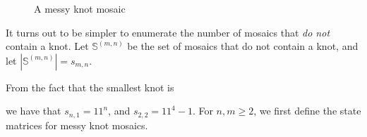 \documentclass[12pt]{article}
\theoremstyle{plain}
\theoremstyle{definition}
\theoremstyle{remark}
\theoremstyle{definition}
\newcommand{\cell}[4]{ \draw[thick] ( #1 , #2 ) rectangle ( #3 , #4 );}
\newcommand{\cellA}[4]{\draw[red, thick, densely dotted] ( #1 + 0.5 , #2 ) arc(0:90:{0.5}); \draw[thick] ( #1 , #2 ) rectangle ( #3 , #4 );}
\newcommand{\cellB}[4]{\draw[red, thick, densely dotted] ( #1 + 1 , #2 + 0.5 ) arc(90:180:{0.5}); \draw[thick] ( #1 , #2 ) rectangle ( #3 , #4 );}
\newcommand{\cellC}[4]{\draw[red, thick, densely dotted] ( #1 + 0.5, #2 + 1 ) arc(180:270:{0.5}); \draw[thick] ( #1 , #2 ) rectangle ( #3 , #4 );}
\newcommand{\cellD}[4]{\draw[red, thick, densely dotted] ( #1 , #2 + 0.5 ) arc(-90:0:{0.5}); \draw[thick] ( #1 , #2 ) rectangle ( #3 , #4 );}
\newcommand{\cellF}[4]{\draw[red, thick, densely dotted] (#3 * 0.5 + #1 * 0.5 , #2) -- (#3 * 0.5 + #1 * 0.5 , #4); \draw[thick] ( #1 , #2 ) rectangle ( #3 , #4 );}
\newcommand{\cellG}[4]{\draw[red, thick, densely dotted] ( #1 + 0.5 , #2 ) arc(0:90:{0.5}); \draw[red, thick, densely dotted] ( #1 + 0.5, #2 + 1 ) arc(180:270:{0.5}); \draw[thick] ( #1 , #2 ) rectangle ( #3 , #4 );}
\newcommand{\cellH}[4]{\draw[red, thick, densely dotted] ( #1 , #2 + 0.5 ) arc(-90:0:{0.5}); \draw[red, thick, densely dotted] ( #1 + 1 , #2 + 0.5 ) arc(90:180:{0.5}); \draw[thick] ( #1 , #2 ) rectangle ( #3 , #4 );}
\newcommand{\cellI}[4]{\draw[red, thick, densely dotted] (#3 * 0.5 + #1 * 0.5 , #2) -- (#3 * 0.5 + #1 * 0.5 , #4); \node[shape=circle,draw=none,fill=white, inner sep=3pt,minimum size=5pt] (A) at ( #1 + 0.5 , #2 + 0.5 ) {}; \draw[red, thick, densely dotted] (#3, #4 * 0.5 + #2 * 0.5) -- (#1, #4 * 0.5 + #2 * 0.5); \draw[thick] ( #1 , #2 ) rectangle ( #3 , #4 );}
\newcommand{\cellAf}[4]{\filldraw[gray!40] ( #1 , #2 ) rectangle ( #3 , #4 ); \draw[red, thick, densely dotted] ( #1 + 0.5 , #2 ) arc(0:90:{0.5}); \draw[thick] ( #1 , #2 ) rectangle ( #3 , #4 );}
\newcommand{\cellBf}[4]{\filldraw[gray!40] ( #1 , #2 ) rectangle ( #3 , #4 ); \draw[red, thick, densely dotted] ( #1 + 1 , #2 + 0.5 ) arc(90:180:{0.5}); \draw[thick] ( #1 , #2 ) rectangle ( #3 , #4 );}
\newcommand{\cellCf}[4]{\filldraw[gray!40] ( #1 , #2 ) rectangle ( #3 , #4 ); \draw[red, thick, densely dotted] ( #1 + 0.5, #2 + 1 ) arc(180:270:{0.5}); \draw[thick] ( #1 , #2 ) rectangle ( #3 , #4 );}
\newcommand{\cellDf}[4]{\filldraw[gray!40] ( #1 , #2 ) rectangle ( #3 , #4 ); \draw[red, thick, densely dotted] ( #1 , #2 + 0.5 ) arc(-90:0:{0.5}); \draw[thick] ( #1 , #2 ) rectangle ( #3 , #4 );}
\newcommand{\cellEf}[4]{\filldraw[gray!40] ( #1 , #2 ) rectangle ( #3 , #4 ); \draw[red, thick, densely dotted] (#3, #4 * 0.5 + #2 * 0.5) -- (#1, #4 * 0.5 + #2 * 0.5); \draw[thick] ( #1 , #2 ) rectangle ( #3 , #4 );}
\newcommand{\cellFf}[4]{\filldraw[gray!40] ( #1 , #2 ) rectangle ( #3 , #4 ); \draw[red, thick, densely dotted] (#3 * 0.5 + #1 * 0.5 , #2) -- (#3 * 0.5 + #1 * 0.5 , #4); \draw[thick] ( #1 , #2 ) rectangle ( #3 , #4 );}
\newcommand{\cellIf}[4]{\filldraw[gray!40] ( #1 , #2 ) rectangle ( #3 , #4 ); \draw[red, thick, densely dotted] (#3 * 0.5 + #1 * 0.5 , #2) -- (#3 * 0.5 + #1 * 0.5 , #4); \node[shape=circle,draw=none,fill=gray!40, inner sep=3pt,minimum size=5pt] (A) at ( #1 + 0.5 , #2 + 0.5 ) {}; \draw[red, thick, densely dotted] (#3, #4 * 0.5 + #2 * 0.5) -- (#1, #4 * 0.5 + #2 * 0.5); \draw[thick] ( #1 , #2 ) rectangle ( #3 , #4 );}
\begin{document}
\begin{figure}[h!]
\begin{center}
\end{center}
\caption{A messy knot mosaic}
\label{fig:messy mosaic example}
\end{figure}

It turns out to be simpler to enumerate the number of mosaics that \textit{do not} contain a knot. Let $\mathbb{S}^{(m,n)}$ be the set of mosaics that do not contain a knot, and let $|\mathbb{S}^{(m,n)}| = s_{m,n}$. 

From the fact that the smallest knot is 

\begin{center}
\end{center}

we have that $s_{n,1}=11^n$, and $s_{2,2} = 11^4 - 1$. For $n,m \geq 2$, we first define the state matrices for messy knot mosaics.
\end{document}

